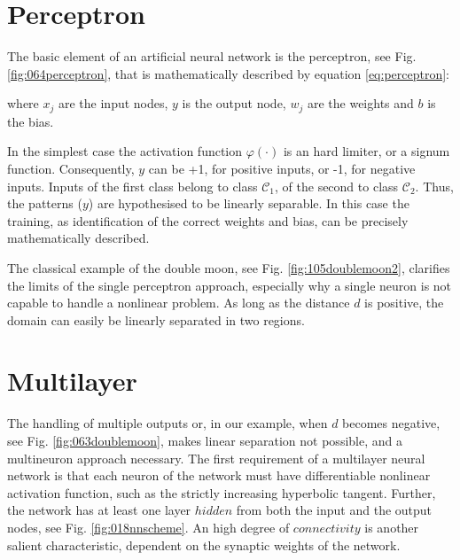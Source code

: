 \section{Perceptron}
\label{sec:perceptron}

The basic element of an artificial neural network is the perceptron, see Fig.
\ref{fig:064perceptron}, that is mathematically described by equation
\ref{eq:perceptron}: 

where $x_j$ are the input nodes, $y$ is the output node, $w_j$ are the weights
and $b$ is the bias.

In the simplest case  the activation function $\varphi(\cdot)$ is an hard
limiter, or a signum function.
Consequently, $y$ can be +1, for positive inputs, or -1, for negative inputs. Inputs of the first class
belong to class $\mathscr{C}_1$, of the second to class $\mathscr{C}_2$.
Thus, the patterns ($y$) are hypothesised to be linearly separable.
In this case the training, as identification of the correct weights and bias,
can be precisely mathematically described.

The classical example of the double moon, see Fig. \ref{fig:105doublemoon2},
clarifies the limits of the single perceptron approach, especially 
why a single neuron is not capable to handle a
nonlinear problem.
As long as the distance $d$ is positive, the domain can easily be
linearly separated in two regions.

\section{Multilayer}
\label{sec:multilayer}



The handling of multiple outputs or, in our example, 
when $d$ becomes negative, see Fig. \ref{fig:063doublemoon}, makes linear
separation not possible, and a multineuron approach necessary. 
The first requirement of a multilayer neural network
is that each neuron of the network must have differentiable nonlinear activation
function, such as the strictly increasing hyperbolic tangent.
Further, the network has at least one layer $hidden$ from both the input and the
output nodes, see Fig. \ref{fig:018nnscheme}.
An high degree of $connectivity$ is another salient characteristic, dependent on
the synaptic weights of the network.




